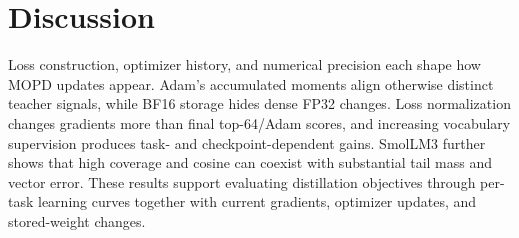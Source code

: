 \section{Discussion}

Loss construction, optimizer history, and numerical precision each shape how MOPD updates appear. Adam's accumulated moments align otherwise distinct teacher signals, while BF16 storage hides dense FP32 changes. Loss normalization changes gradients more than final top-64/Adam scores, and increasing vocabulary supervision produces task- and checkpoint-dependent gains. SmolLM3 further shows that high coverage and cosine can coexist with substantial tail mass and vector error. These results support evaluating distillation objectives through per-task learning curves together with current gradients, optimizer updates, and stored-weight changes.
